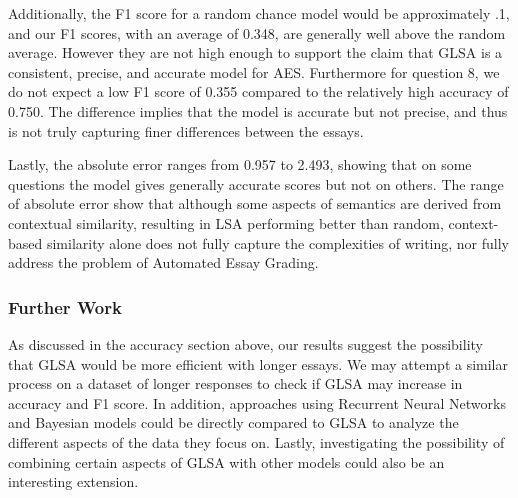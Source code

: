 \documentclass[10pt,letterpaper]{article}
\begin{document}
Additionally, the F1 score for a random chance model would be approximately .1, and our F1 scores, with an average of 0.348, are generally well above the random average. However they are not high enough to support the claim that GLSA is a consistent, precise, and accurate model for AES. Furthermore for question 8, we do not expect a low F1 score of 0.355 compared to the relatively high accuracy of 0.750. The difference implies that the model is accurate but not precise, and thus is not truly capturing finer differences between the essays. 

Lastly, the absolute error ranges from 0.957 to 2.493, showing that on some questions the model gives generally accurate scores but not on others. The range of absolute error show that although some aspects of semantics are derived from contextual similarity, resulting in LSA performing better than random, context-based similarity alone does not fully capture the complexities of writing, nor fully address the problem of Automated Essay Grading. 

\subsubsection{Further Work}
As discussed in the accuracy section above, our results suggest the possibility that GLSA would be more efficient with longer essays. We may attempt a similar process on a dataset of longer responses to check if GLSA may increase in accuracy and F1 score. In addition, approaches using Recurrent Neural Networks and Bayesian models could be directly compared to GLSA to analyze the different aspects of the data they focus on. Lastly, investigating the possibility of combining certain aspects of GLSA with other models could also be an interesting extension.

\nocite{landauer1998introduction}
\nocite{kintsch2002potential}
\nocite{islam2010automated}
\nocite{shermis2014state}
\nocite{hewlett2012aes}



\setlength{\bibleftmargin}{.125in}
\setlength{\bibindent}{-\bibleftmargin}


\end{document}
